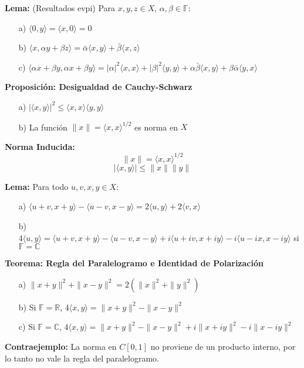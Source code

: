 \documentclass{article}
\begin{document}
\textbf{Lema:} (Resultados evpi) Para $x, y, z \in X$, $\alpha, \beta \in \mathbb{F}$:
\begin{itemize}
    \item[a)] $\langle 0, y \rangle = \langle x, 0 \rangle = 0$
    \item[b)] $\langle x, \alpha y + \beta z \rangle = \bar{\alpha} \langle x, y \rangle + \bar{\beta} \langle x, z \rangle$
    \item[c)]
    $\langle \alpha x + \beta y, \alpha x + \beta y \rangle = |\alpha|^2 \langle x, x \rangle + |\beta|^2 \langle y, y \rangle + \alpha \bar{\beta} \langle x, y \rangle + \beta \bar{\alpha} \langle y, x \rangle$
\end{itemize}

\textbf{Proposición: Desigualdad de Cauchy-Schwarz}
\begin{itemize}
    \item[a)] $|\langle x, y \rangle|^2 \le \langle x, x \rangle \langle y, y \rangle$
    \item[b)] La función $\|x\| = \langle x, x \rangle^{1/2}$ es norma en $X$
\end{itemize}

\textbf{Norma Inducida:}
\[
\|x\| = \langle x, x \rangle^{1/2}
\]
\[
|\langle x, y \rangle| \le \|x\| \|y\|
\]

\textbf{Lema:} Para todo $u, v, x, y \in X$:
\begin{itemize}
    \item[a)] $\langle u+v, x+y \rangle - \langle u-v, x-y \rangle = 2\langle u, y \rangle + 2\langle v, x \rangle$
    \item[b)] $4\langle u, y \rangle = \langle u+v, x+y \rangle - \langle u-v, x-y \rangle + i\langle u+iv, x+iy \rangle - i\langle u-ix, x-iy \rangle$ si $\mathbb{F} = \mathbb{C}$
\end{itemize}

\textbf{Teorema: Regla del Paralelogramo e Identidad de Polarización}
\begin{itemize}
    \item[a)] $\|x+y\|^2 + \|x-y\|^2 = 2(\|x\|^2 + \|y\|^2)$
    \item[b)] Si $\mathbb{F} = \mathbb{R}$, $4\langle x, y \rangle = \|x+y\|^2 - \|x-y\|^2$
    \item[c)] Si $\mathbb{F} = \mathbb{C}$, $4\langle x, y \rangle = \|x+y\|^2 - \|x-y\|^2 + i\|x+iy\|^2 - i\|x-iy\|^2$
\end{itemize}

\textbf{Contraejemplo:} La norma en $C[0,1]$ no proviene de un producto interno, por lo tanto no vale la regla del paralelogramo.
\end{document}
